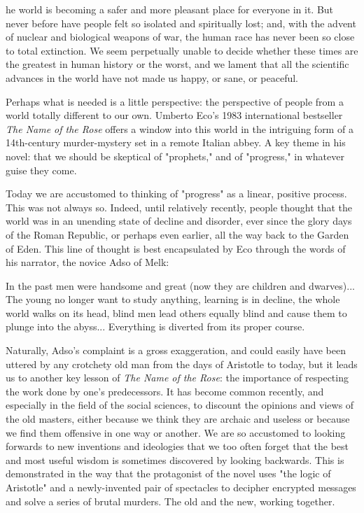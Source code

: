 \label{ch:the-name-of-the-rose}

{\flushright{}}
\smallskip

   he world is becoming a safer and more pleasant place for everyone in
   it. But never before have people felt so isolated and spiritually lost;
   and, with the advent of nuclear and biological weapons of war, the
   human race has never been so close to total extinction. We seem
   perpetually unable to decide whether these times are the greatest in
   human history or the worst, and we lament that all the scientific
   advances in the world have not made us happy, or sane, or peaceful.

   Perhaps what is needed is a little perspective: the perspective of
   people from a world totally different to our own. Umberto Eco's 1983
   international bestseller \emph{The Name of the Rose} offers a window into this
   world in the intriguing form of a 14th-century murder-mystery set in a
   remote Italian abbey. A key theme in his novel: that we should be
   skeptical of "prophets," and of "progress," in whatever guise they
   come.

   Today we are accustomed to thinking of "progress" as a linear, positive
   process. This was not always so. Indeed, until relatively recently,
   people thought that the world was in an unending state of decline and
   disorder, ever since the glory days of the Roman Republic, or perhaps
   even earlier, all the way back to the Garden of Eden. This line of
   thought is best encapsulated by Eco through the words of his narrator,
   the novice Adso of Melk:

     In the past men were handsome and great (now they are children and
     dwarves)... The young no longer want to study anything, learning is
     in decline, the whole world walks on its head, blind men lead others
     equally blind and cause them to plunge into the abyss... Everything
     is diverted from its proper course.

   Naturally, Adso's complaint is a gross exaggeration, and could easily
   have been uttered by any crotchety old man from the days of Aristotle
   to today, but it leads us to another key lesson of \emph{The Name of the
   Rose}: the importance of respecting the work done by one's predecessors.
   It has become common recently, and especially in the field of the
   social sciences, to discount the opinions and views of the old masters,
   either because we think they are archaic and useless or because we find
   them offensive in one way or another. We are so accustomed to
   looking forwards to new inventions and ideologies that we too often
   forget that the best and most useful wisdom is sometimes discovered by
   looking backwards. This is demonstrated in the way that the protagonist
   of the novel uses "the logic of Aristotle" and a newly-invented pair of
   spectacles to decipher encrypted messages and solve a series of brutal
   murders. The old and the new, working together.

